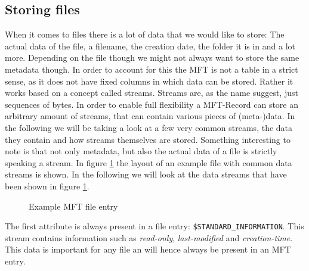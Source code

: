 \subsection{Storing files}
When it comes to files there is a lot of data that we would like to store: The actual data of the file, a filename, the creation date, the folder it is in and a lot more. Depending on the file though we might not always want to store the same metadata though. In order to account for this the MFT is not a table in a strict sense, as it does not have fixed columns in which data can be stored. Rather it works based on a concept called streams. Streams are, as the name suggest, just sequences of bytes. In order to enable full flexibility a MFT-Record can store an arbitrary amount of streams, that can contain various pieces of (meta-)data. In the following we will be taking a look at a few very common streams, the data they contain and how streams themselves are stored. Something interesting to note is that not only metadata, but also the actual data of a file is strictly speaking a stream. In figure \ref{fig:mft_entry} the layout of an example file with common data streams is shown. In the following we will look at the data streams that have been shown in figure \ref{fig:mft_entry}.
\begin{figure}[H]
	\centering
	\caption{Example MFT file entry\label{fig:mft_entry}}
\end{figure}
The first attribute is always present in a file entry: \texttt{\$STANDARD\_INFORMATION}. This stream contains information such as \textit{read-only}, \textit{last-modified} and \textit{creation-time}. This data is important for any file an will hence always be present in an MFT entry.\cite{RUSSINOVICH_ET_AL:2012:WI}\\
